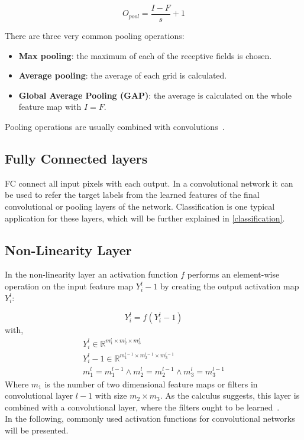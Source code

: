 \begin{equation}
    O_{pool}=\frac{I-F}{s}+1
\end{equation}

There are three very common pooling operations:
\begin{itemize}
    \item \textbf{Max pooling}: the maximum of each of the receptive fields is chosen.
    \item \textbf{Average pooling}: the average of each grid is calculated.
    \item \textbf{Global Average Pooling (GAP)}: the average is calculated on the whole feature map with $I=F$.
\end{itemize}
Pooling operations are usually combined with convolutions~\cite{advanceddeeplearningpython}.

\subsection{Fully Connected layers}
\gls{FC} connect all input pixels with each output.
In a convolutional network it can be used to refer the target labels from the learned features of the final convolutional
or pooling layers of the network.
Classification is one typical application for these layers, which will be further explained in \autoref{classification}.


\subsection{Non-Linearity Layer}
In the non-linearity layer an activation function $f$ performs an element-wise operation on the input feature map
$Y_i^l-1$ by creating the output activation map $Y_i^l$:

\begin{equation}
    Y_i^l=f(Y_i^l-1)
\end{equation}
with,
\begin{align}
    Y_i^l\in\mathbb{R}^{m_1^l\times m_2^l\times m_3^l} \\
    Y_i^l-1\in\mathbb{R}^{m_1^{l-1}\times m_2^{l-1}\times m_3^{l-1}} \\
    m_1^l = m_1^{l-1} \land m_2^l = m_2^{l-1} \land m_3^l = m_3^{l-1}
\end{align}
Where $m_1$ is the number of two dimensional feature maps or filters in convolutional layer $l-1$
with size $m_2 \times m_3$.
As the calculus suggests, this layer is combined with a convolutional layer, where the filters ought to be
 learned~\cite{wikitumcnn}.\\
In the following, commonly used activation functions for convolutional networks will be presented.

